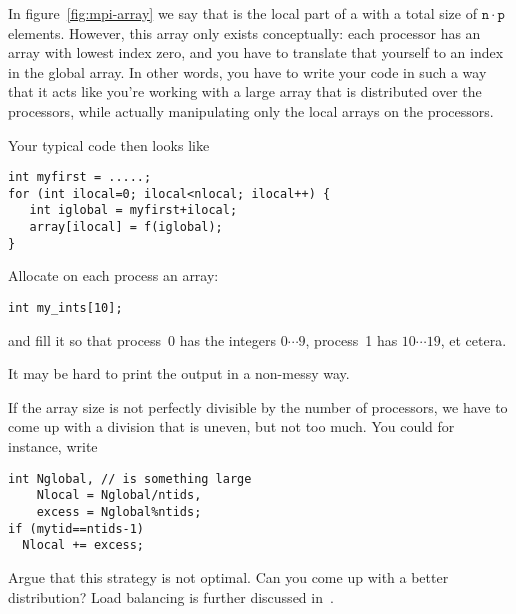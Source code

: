 In figure~\ref{fig:mpi-array} we
say that  is the local part
of a  with a total size of
$\mathtt{n}\cdot\mathtt{p}$
elements.
However, this array only exists
conceptually: each processor has an array with lowest index zero,
and you have to translate that yourself to an index in the global
array.
In other words, you have to write your code in such a way that
it acts like you're working with a large array that is distributed
over the processors, while
actually manipulating only the local arrays on the processors.


Your typical code then looks like

\begin{lstlisting}
int myfirst = .....;
for (int ilocal=0; ilocal<nlocal; ilocal++) {
   int iglobal = myfirst+ilocal;
   array[ilocal] = f(iglobal);
}
\end{lstlisting}

\begin{exercise}
  \label{ex:array-ints}
  Allocate on each process an array:
\begin{lstlisting}
int my_ints[10];    
\end{lstlisting}
and fill it so that process~0 has the integers $0\cdots 9$, process~1 has $10\cdots 19$,
et cetera.

It may be hard to print the output in a non-messy way.
\end{exercise}

If the array size is not perfectly divisible by the number of processors,
we have to come up with a division that is uneven, but not too much.
You could for instance, write

\begin{lstlisting}
int Nglobal, // is something large
    Nlocal = Nglobal/ntids,
    excess = Nglobal%ntids;
if (mytid==ntids-1) 
  Nlocal += excess;
\end{lstlisting}

\begin{exercise}
  Argue that this strategy is not optimal. Can you come up with a
  better distribution?
  Load balancing is further discussed in~.
\end{exercise}

\begin{comment}
  \begin{exercise}
    \label{ex:inproduct}
    Implement an inner product routine: let $x$ be a
    distributed vector of size~$N$ with elements $x[i]=i$,
    and compute~$x^tx$.
    As before, the right value is $(2N^3+3N^2+N)/6$.

    Use the inner product value to scale to vector so that it has
    norm~1.
    Check that your computation is correct.
  \end{exercise}
\end{comment}


